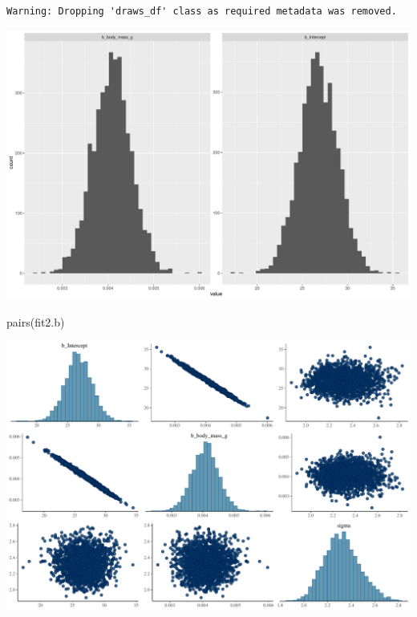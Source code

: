 \documentclass[
  letterpaper,
  DIV=11,
  numbers=noendperiod]{scrartcl}
\newenvironment{Shaded}{\begin{snugshade}}{\end{snugshade}}
\newcommand{\FunctionTok}[1]{\textcolor[rgb]{0.28,0.35,0.67}{#1}}
\newcommand{\NormalTok}[1]{\textcolor[rgb]{0.00,0.23,0.31}{#1}}
\begin{document}
\begin{verbatim}
Warning: Dropping 'draws_df' class as required metadata was removed.
\end{verbatim}

\includegraphics{Bayes_Lab_1_files/figure-pdf/unnamed-chunk-59-1.pdf}

\begin{Shaded}
\begin{Highlighting}[]
\FunctionTok{pairs}\NormalTok{(fit2.b)}
\end{Highlighting}
\end{Shaded}

\includegraphics{Bayes_Lab_1_files/figure-pdf/unnamed-chunk-59-2.pdf}
\end{document}
